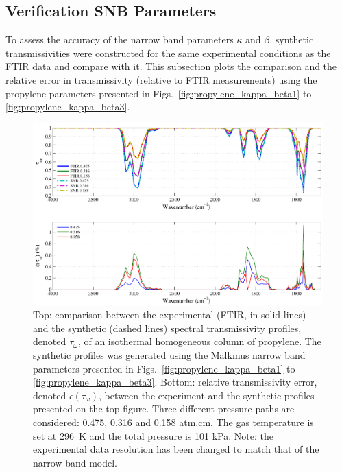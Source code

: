 \subsection{Verification SNB Parameters}

To assess the accuracy of the narrow band parameters $\bar{\kappa}$ and $\beta$, synthetic transmissivities were constructed for the same experimental conditions as the FTIR data and compare with it. This subsection plots the comparison and the relative error in transmissivity (relative to FTIR measurements) using the propylene parameters presented in Figs.~\ref{fig:propylene_kappa_beta1} to \ref{fig:propylene_kappa_beta3}.

\begin{figure}[!h]
\includegraphics[width=\textwidth]{Figures/Comparison_Fit_Propylene_MALKMUS_Temp296K.pdf}
\caption{Top: comparison between the experimental (FTIR, in solid lines) and the synthetic (dashed lines) spectral transmissivity profiles, denoted $\tau_{\omega}$, of an isothermal homogeneous column of propylene. The synthetic profiles was generated using the Malkmus narrow band parameters presented in Figs.~\ref{fig:propylene_kappa_beta1} to \ref{fig:propylene_kappa_beta3}. Bottom: relative transmissivity error, denoted $\epsilon{(\tau_{\omega})}$, between the experiment and the synthetic profiles presented on the top figure. Three different pressure-paths are considered: 0.475, 0.316 and 0.158 atm.cm. The gas temperature is set at 296~K and the total pressure is 101 kPa. Note: the experimental data resolution has been changed to match that of the narrow band model. \label{fig:propylene_SNBVerify_296K}}
\end{figure}

